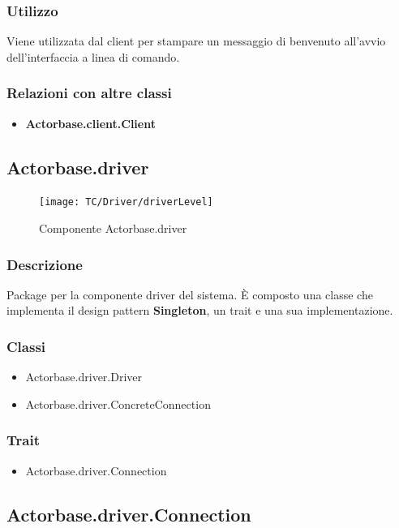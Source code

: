 \documentclass[a4paper]{article}
\begin{document}
			\subsubsection{Utilizzo}
				Viene utilizzata dal client per stampare un messaggio di benvenuto all'avvio dell'interfaccia a linea di comando.
				
			\subsubsection{Relazioni con altre classi}
				\begin{itemize}
					\item \textbf{Actorbase.client.Client}
				\end{itemize}
				
		\subsection{Actorbase.driver}
		
			\begin{figure}[H]
				\centering
				\texttt{[image: TC/Driver/driverLevel]}
				\caption{Componente Actorbase.driver}
			\end{figure}
			\subsubsection{Descrizione}
				Package per la componente driver del sistema. 
				È composto una classe che implementa il design pattern \textbf{Singleton}, un trait e una sua implementazione.
				
			\subsubsection{Classi}
				\begin{itemize}
					\item Actorbase.driver.Driver
					\item Actorbase.driver.ConcreteConnection
				\end{itemize}
			
			\subsubsection{Trait}
				\begin{itemize}
					\item Actorbase.driver.Connection
				\end{itemize}
					
		\subsection{Actorbase.driver.Connection}
\end{document}
